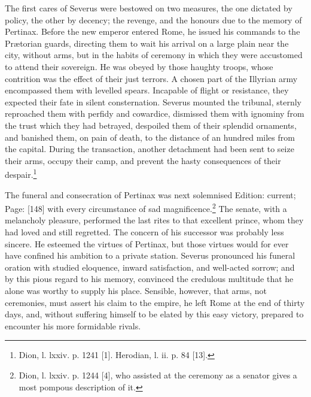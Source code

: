 The first cares of Severus were bestowed on two measures, the one dictated by policy, the other by decency; the revenge, and the honours due to the memory of Pertinax. Before the new emperor entered Rome, he issued his commands to the Prætorian guards, directing them to wait his arrival on a large plain near the city, without arms, but in the habits of ceremony in which they were accustomed to attend their sovereign. He was obeyed by those haughty troops, whose contrition was the effect of their just terrors. A chosen part of the Illyrian army encompassed them with levelled spears. Incapable of flight or resistance, they expected their fate in silent consternation. Severus mounted the tribunal, sternly reproached them with perfidy and cowardice, dismissed them with ignominy from the trust which they had betrayed, despoiled them of their splendid ornaments, and banished them, on pain of death, to the distance of an hundred miles from the capital. During the transaction, another detachment had been sent to seize their arms, occupy their camp, and prevent the hasty consequences of their despair.\footnote{Dion, l. lxxiv. p. 1241 [1]. Herodian, l. ii. p. 84 [13].}

The funeral and consecration of Pertinax was next solemnised Edition: current; Page: [148] with every circumstance of sad magnificence.\footnote{Dion, l. lxxiv. p. 1244 [4], who assisted at the ceremony as a senator gives a most pompous description of it.} The senate, with a melancholy pleasure, performed the last rites to that excellent prince, whom they had loved and still regretted. The concern of his successor was probably less sincere. He esteemed the virtues of Pertinax, but those virtues would for ever have confined his ambition to a private station. Severus pronounced his funeral oration with studied eloquence, inward satisfaction, and well-acted sorrow; and by this pious regard to his memory, convinced the credulous multitude that he alone was worthy to supply his place. Sensible, however, that arms, not ceremonies, must assert his claim to the empire, he left Rome at the end of thirty days, and, without suffering himself to be elated by this easy victory, prepared to encounter his more formidable rivals.

